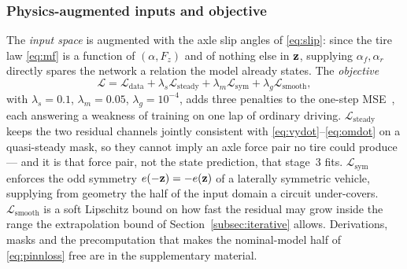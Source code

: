 \subsubsection{Physics-augmented inputs and objective}
\label{subsec:physinputs}
The \emph{input space} is augmented with the axle slip angles of
\eqref{eq:slip}: since the tire law \eqref{eq:mf} is a function of
$(\alpha,F_{z})$ and of nothing else in $\mathbf{z}$, supplying
$\alpha_{f},\alpha_{r}$ directly spares the network a relation the model
already states. The \emph{objective}
\begin{equation}
\mathcal{L}=\mathcal{L}_{\mathrm{data}}
+\lambda_{s}\mathcal{L}_{\mathrm{steady}}
+\lambda_{m}\mathcal{L}_{\mathrm{sym}}
+\lambda_{g}\mathcal{L}_{\mathrm{smooth}},
\label{eq:pinnloss}
\end{equation}
with $\lambda_{s}=0.1$, $\lambda_{m}=0.05$, $\lambda_{g}=10^{-4}$, adds three
penalties to the one-step MSE~\cite{raissi2019pinn,deepdynamics2024}, each
answering a weakness of training on one lap of ordinary driving.
$\mathcal{L}_{\mathrm{steady}}$ keeps the two residual channels jointly
consistent with \eqref{eq:vydot}--\eqref{eq:omdot} on a quasi-steady mask, so
they cannot imply an axle force pair no tire could produce --- and it is that
force pair, not the state prediction, that stage~3 fits.
$\mathcal{L}_{\mathrm{sym}}$ enforces the odd symmetry $e(-\mathbf{z})=-e(\mathbf{z})$ of
a laterally symmetric vehicle, supplying from geometry the half of the input
domain a circuit under-covers. $\mathcal{L}_{\mathrm{smooth}}$ is a soft
Lipschitz bound on how fast the residual may grow inside the range the
extrapolation bound of Section~\ref{subsec:iterative} allows. Derivations,
masks and the precomputation that makes the nominal-model half of
\eqref{eq:pinnloss} free are in the supplementary material.

